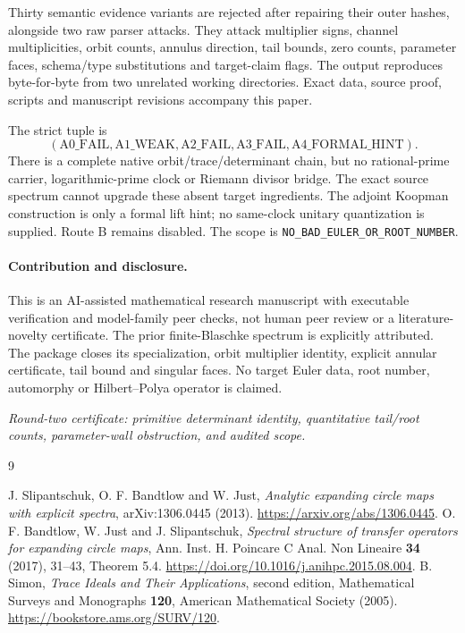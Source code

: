 \documentclass[10pt]{article}
\begin{document}
Thirty semantic evidence variants are rejected after repairing their
outer hashes, alongside two raw parser attacks. They attack multiplier signs, channel multiplicities, orbit
counts, annulus direction, tail bounds, zero counts, parameter faces,
schema/type substitutions and target-claim flags. The output reproduces
byte-for-byte from two unrelated working directories. Exact data, source
proof, scripts and manuscript revisions accompany this paper.

The strict tuple is
\[
 (\mathrm{A0\_FAIL},\mathrm{A1\_WEAK},\mathrm{A2\_FAIL},
 \mathrm{A3\_FAIL},\mathrm{A4\_FORMAL\_HINT}).
\]
There is a complete native orbit/trace/determinant chain, but no
rational-prime carrier, logarithmic-prime clock or Riemann divisor bridge.
The exact source spectrum cannot upgrade these absent target ingredients.
The adjoint Koopman construction is only a formal lift hint; no same-clock
unitary quantization is supplied. Route B remains disabled. The scope is
\texttt{NO\_BAD\_EULER\_OR\_ROOT\_NUMBER}.

\paragraph{Contribution and disclosure.}
This is an AI-assisted mathematical research manuscript with executable
verification and model-family peer checks, not human peer review or a
literature-novelty certificate. The prior finite-Blaschke spectrum is
explicitly attributed. The package closes its specialization, orbit
multiplier identity, explicit annular certificate, tail bound and singular
faces. No target Euler data, root number, automorphy or Hilbert--Polya
operator is claimed.
\par\noindent\emph{Round-two certificate: primitive determinant identity,
quantitative tail/root counts, parameter-wall obstruction, and audited scope.}
\fi

\begin{thebibliography}{9}
\raggedright
{} J. Slipantschuk, O. F. Bandtlow and W. Just,
\emph{Analytic expanding circle maps with explicit spectra},
arXiv:1306.0445 (2013). \url{https://arxiv.org/abs/1306.0445}.
 O. F. Bandtlow, W. Just and J. Slipantschuk,
\emph{Spectral structure of transfer operators for expanding circle maps},
Ann. Inst. H. Poincare C Anal. Non Lineaire \textbf{34} (2017), 31--43,
Theorem 5.4. \url{https://doi.org/10.1016/j.anihpc.2015.08.004}.
 B. Simon, \emph{Trace Ideals and Their Applications},
second edition, Mathematical Surveys and Monographs \textbf{120},
American Mathematical Society (2005).
\url{https://bookstore.ams.org/SURV/120}.
\end{thebibliography}
\end{document}
